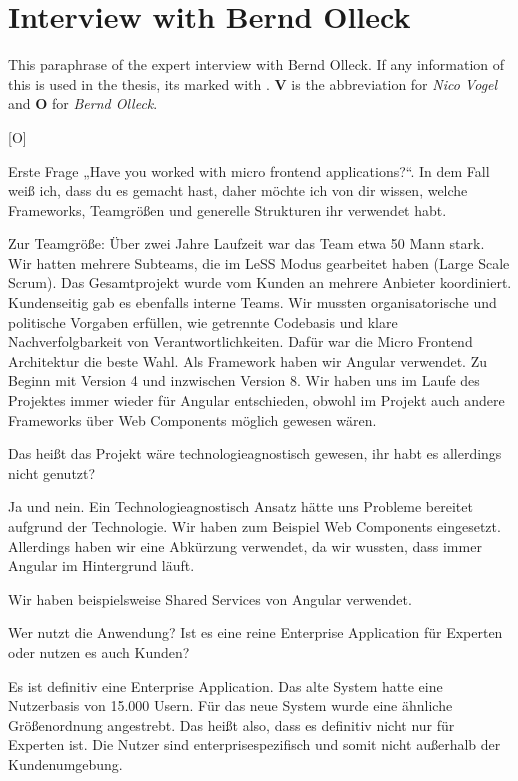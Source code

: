 
\section{Interview with Bernd Olleck}

This paraphrase of the expert interview with Bernd Olleck.
If any information of this is used in the thesis, its marked with \cite{Vogel.2020.Olleck}.
\textbf{V} is the abbreviation for \textit{Nico Vogel} and \textbf{O} for \textit{Bernd Olleck}.

[O]

\begin{description}
    \NicoVogel Erste Frage „Have you worked with micro frontend applications?“. In dem Fall weiß ich, dass du es gemacht hast, daher möchte ich von dir wissen, welche Frameworks, Teamgrößen und generelle Strukturen ihr verwendet habt.

    \BerndOlleck Zur Teamgröße: Über zwei Jahre Laufzeit war das Team etwa 50 Mann stark. Wir hatten mehrere Subteams, die im LeSS Modus gearbeitet haben (Large Scale Scrum). Das Gesamtprojekt wurde vom Kunden an mehrere Anbieter koordiniert. Kundenseitig gab es ebenfalls interne Teams. Wir mussten organisatorische und politische Vorgaben erfüllen, wie getrennte Codebasis und klare Nachverfolgbarkeit von Verantwortlichkeiten. Dafür war die Micro Frontend Architektur die beste Wahl. Als Framework haben wir Angular verwendet. Zu Beginn mit Version 4 und inzwischen Version 8. Wir haben uns im Laufe des Projektes immer wieder für Angular entschieden, obwohl im Projekt auch andere Frameworks über Web Components möglich gewesen wären.

    \NicoVogel Das heißt das Projekt wäre technologieagnostisch gewesen, ihr habt es allerdings nicht genutzt?

    \BerndOlleck Ja und nein. Ein Technologieagnostisch Ansatz hätte uns Probleme bereitet aufgrund der Technologie.
    Wir haben zum Beispiel Web Components eingesetzt. Allerdings haben wir eine Abkürzung verwendet, da wir wussten, dass immer Angular im Hintergrund läuft.

    Wir haben beispielsweise Shared Services von Angular verwendet.

    \NicoVogel Wer nutzt die Anwendung? Ist es eine reine Enterprise Application für Experten oder nutzen es auch Kunden?

    \BerndOlleck Es ist definitiv eine Enterprise Application. Das alte System hatte eine Nutzerbasis von 15.000 Usern. Für das neue System wurde eine ähnliche Größenordnung angestrebt. Das heißt also, dass es definitiv nicht nur für Experten ist. Die Nutzer sind enterprisespezifisch und somit nicht außerhalb der Kundenumgebung.


\end{description}
